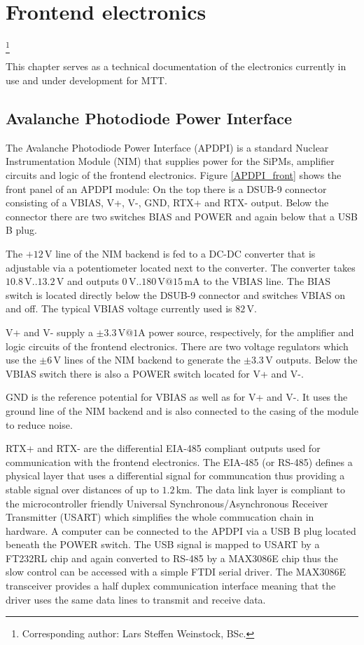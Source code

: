 \documentclass[]{article}
\begin{document}
\newpage
\section{Frontend electronics }
	\footnote{Corresponding author: Lars Steffen Weinstock, BSc.}
	\label{sec:FEelectronics}

This chapter serves as a technical documentation of the electronics currently in use and under development for MTT.

\subsection{Avalanche Photodiode Power Interface}

The Avalanche Photodiode Power Interface (APDPI) is a standard Nuclear Instrumentation Module (NIM) that supplies power for the SiPMs, amplifier circuits and logic of the frontend electronics.
Figure \ref{APDPI_front} shows the front panel of an APDPI module: On the top there is a DSUB-9 connector consisting of a VBIAS, V+, V-, GND, RTX+ and RTX- output.
Below the connector there are two switches BIAS and POWER and again below that a USB B plug.

The $+12\,\text{V}$ line of the NIM backend is fed to a DC-DC converter that is adjustable via a potentiometer located next to the converter.
The converter takes $10.8\,\text{V} .. 13.2\,\text{V}$ and outputs $0\,\text{V} .. 180\,\text{V}@15\,\text{mA}$ to the VBIAS line. The BIAS switch is located directly below the
DSUB-9 connector and switches VBIAS on and off. The typical VBIAS voltage currently used is $82\,\text{V}$.

V+ and V- supply a $\pm3.3\,\text{V}@1\text{A}$ power source, respectively, for the amplifier and logic circuits of the frontend electronics. There are two voltage regulators 
which use the $\pm6\,\text{V}$ lines of the NIM backend to generate the $\pm3.3\,\text{V}$ outputs. Below the VBIAS switch there is also a POWER switch located for V+ and V-.

GND is the reference potential for VBIAS as well as for V+ and V-. It uses the ground line of the NIM backend and is also connected to the casing of the 
module to reduce noise.

RTX+ and RTX- are the differential EIA-485 compliant outputs used for communication with the frontend electronics. The EIA-485 (or RS-485) 
defines a physical layer that uses a differential signal for communcation thus providing a stable signal over distances of up to $1.2\,\text{km}$. The data link layer is 
compliant to the microcontroller friendly Universal Synchronous/Asynchronous Receiver Transmitter (USART) which simplifies the whole commucation chain in hardware. 
A computer can be connected to the APDPI via a USB B plug located beneath the POWER switch. The USB signal is mapped to USART by a FT232RL
chip and again converted to RS-485 by a MAX3086E chip thus the slow control can be accessed with a simple 
FTDI serial driver.
The MAX3086E transceiver provides a half duplex communication interface meaning that the driver uses the same data lines to transmit and receive data.
\end{document}
